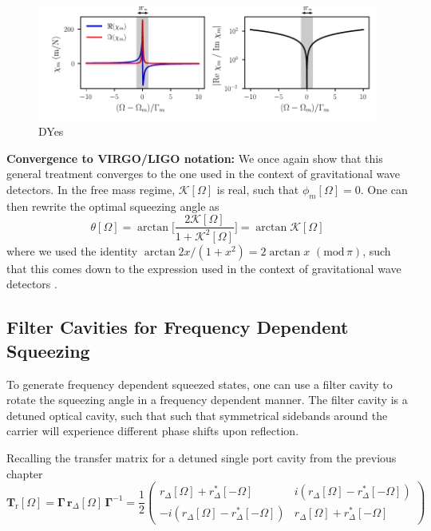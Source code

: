 \begin{figure}
  \centering
  \includegraphics[width=\textwidth]{./chap3/fig/chi_meca.pdf}
  \caption{DYes}
  \label{fig:freq_indep_squeezing}
\end{figure}

\noindent \textbf{Convergence to VIRGO/LIGO notation:} We once again show that this general treatment converges to the one used in the context of gravitational wave detectors. In the free mass regime, $\mathcal{K}[\Omega]$ is real, such that $\phi_m[\Omega]=0$. One can then rewrite the optimal squeezing angle as
\begin{equation}
  \theta[\Omega] = \arctan \Big[\dfrac{2\mathcal{K}[\Omega]}{1 + \mathcal{K}^2[\Omega]}\Big] = \arctan \mathcal{K}[\Omega]
\end{equation}
where we used the identity $\arctan 2x/(1+x^2) = 2\arctan x \, \, (\text{mod}\, \pi)$, such that this comes down to the expression used in the context of gravitational wave detectors \cite{harry_advanced_2010, aasi_enhanced_2013}.


\subsection{Filter Cavities for Frequency Dependent Squeezing}

To generate frequency dependent squeezed states, one can use a filter cavity to rotate the squeezing angle in a frequency dependent manner. The filter cavity is a detuned optical cavity, such that such that symmetrical sidebands around the carrier will experience different phase shifts upon reflection. 

Recalling the transfer matrix for a detuned single port cavity from the previous chapter 
\begin{equation}
\mathbf{T}_{\mathrm{r}}[\Omega] = \mathbf{\Gamma} \, \mathbf{r}_{\Delta}[\Omega] \, \mathbf{\Gamma}^{-1} = \frac{1}{2}  \begin{pmatrix}
    r_{\Delta}[\Omega] + r_{\Delta}^*[-\Omega] & i(r_{\Delta}[\Omega] - r_{\Delta}^*[-\Omega]) \\
    -i(r_{\Delta}[\Omega] - r_{\Delta}^*[-\Omega]) & r_{\Delta}[\Omega] + r_{\Delta}^*[-\Omega]
  \end{pmatrix}
\end{equation}




